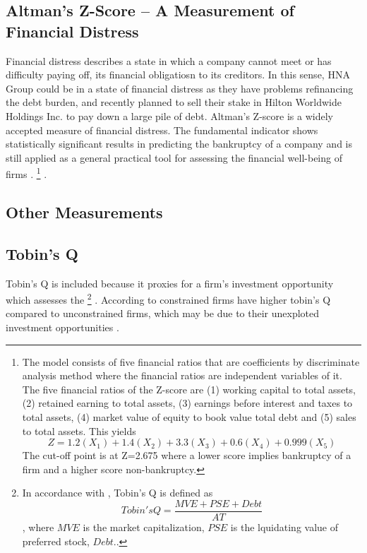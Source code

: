 \documentclass[12pt]{article}
\begin{document}
\subsection{Altman's Z-Score -- A Measurement of Financial Distress}
Financial distress describes a state in which a company cannot meet or has difficulty paying off, its financial obligatiosn to its creditors. In this sense, HNA Group could be in a state of financial distress as they have problems refinancing the debt burden, and recently planned to sell their stake in Hilton Worldwide Holdings Inc. to pay down a large pile of debt. Altman's Z-score is a widely accepted measure of financial distress. The fundamental indicator shows statistically significant results in predicting the bankruptcy of a company \citep{Campbell2008} and is still applied as a general practical tool for assessing the financial well-being of firms \citep{Kleinert2014}. 
	\footnote{The model consists of five financial ratios that are coefficients by discriminate analysis method where the financial ratios are independent variables of it. The five financial ratios of the Z-score are (1) working capital to total assets, (2) retained earning to total assets, (3) earnings before interest and taxes to total assets, (4) market value of equity to book value total debt and (5) sales to total assets. This yields
		\begin{equation}
			Z=1.2(X_{1})+1.4(X_{2})+3.3(X_{3})+0.6(X_{4})+0.999(X_{5})
		\end{equation}
	The cut-off point is at Z=2.675 where a lower score implies bankruptcy of a firm and a higher score non-bankruptcy.}
.

\subsection{Other Measurements}

\subsection{Tobin's Q}
Tobin's Q is included because it proxies for a firm's investment opportunity which assesses the 
\footnote{In accordance with \citet{Brigida2012}, Tobin's Q is defined as 
\begin{equation}
	Tobin's Q= \frac{MVE + PSE + Debt}{AT}
\end{equation}, where $MVE$ is the market capitalization, $PSE$ is the lquidating value of preferred stock, $Debt$.. } 
\citep{DUCHIN2010}. According to \citet{Khatami2014} constrained firms have higher tobin's Q compared to unconstrained firms, which may be due to their unexploted investment opportunities \citep{Khatami2014}.
\end{document}
